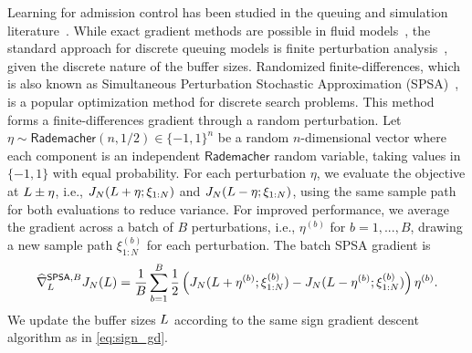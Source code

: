 Learning for admission control has been studied in the queuing and simulation literature~\cite{cassandras2002perturbation, cassandras2003perturbation, ho1983new, cohen2024learning}. While exact gradient methods are possible in fluid models~\cite{cassandras2002perturbation, cassandras2003perturbation}, the standard approach for discrete queuing models is finite perturbation analysis~\cite{ho1983new}, given the discrete nature of the buffer sizes.
Randomized finite-differences, which is also known as Simultaneous Perturbation Stochastic Approximation (SPSA)~\cite{spall1992multivariate, fu1997optimization}, is a popular optimization method for discrete search problems. This method forms a finite-differences gradient through a random perturbation. Let $\eta \sim \mathsf{Rademacher}(n, 1/2) \in \{-1,1 \}^{n}$ be a random $n$-dimensional vector where each component is an independent $\mathsf{Rademacher}$ random variable, taking values in $\{-1,1 \}$ with equal probability. For each perturbation $\eta$, we evaluate the objective at $L \pm \eta$, i.e., $J_N(L + \eta; \xi_{1:N})$ and $J_N(L - \eta; \xi_{1:N})$, using the same sample path for both evaluations to reduce variance. For improved performance, we average the gradient across a batch of $B$ perturbations, i.e., $\eta^{(b)}$ for $b=1,...,B$, drawing a new sample path $\xi^{(b)}_{1:N}$ for each perturbation. The batch SPSA gradient is 
\begin{equation}
\widehat{\nabla}_{L}^{\mathsf{SPSA},B} J_{N}(L) = \frac{1}{B} \sum_{b=1}^{B} \frac{1}{2}\left( J_N(L + \eta^{(b)}; \xi^{(b)}_{1:N}) - J_N(L - \eta^{(b)}; \xi^{(b)}_{1:N}) \right) \eta^{(b)}.
\end{equation}
We update the buffer sizes $L$ according to the same sign gradient descent algorithm as in \eqref{eq:sign_gd}. 

